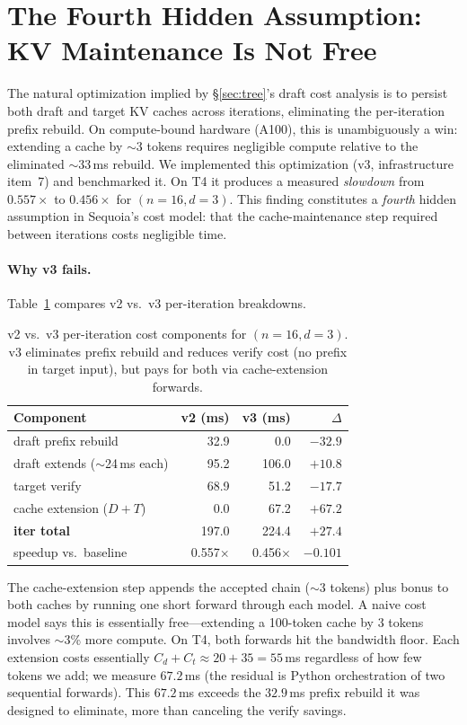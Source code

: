 \documentclass[letterpaper,twocolumn,10pt]{article}
\begin{document}
\section{The Fourth Hidden Assumption: KV Maintenance Is Not Free}
\label{sec:fourth}

The natural optimization implied by \S\ref{sec:tree}'s draft cost analysis is to persist both draft and target KV caches across iterations, eliminating the per-iteration prefix rebuild.
On compute-bound hardware (A100), this is unambiguously a win: extending a cache by $\sim$3 tokens requires negligible compute relative to the eliminated $\sim$33\,ms rebuild.
We implemented this optimization (v3, infrastructure item~7) and benchmarked it.
On T4 it produces a measured \emph{slowdown} from $0.557\times$ to $0.456\times$ for $(n{=}16, d{=}3)$.
This finding constitutes a \emph{fourth} hidden assumption in Sequoia's cost model: that the cache-maintenance step required between iterations costs negligible time.

\paragraph{Why v3 fails.}
Table~\ref{tab:v2v3} compares v2 vs.\ v3 per-iteration breakdowns.

\begin{table}[t]
\centering
\small
\caption{v2 vs.\ v3 per-iteration cost components for $(n{=}16, d{=}3)$. v3 eliminates prefix rebuild and reduces verify cost (no prefix in target input), but pays for both via cache-extension forwards.}
\label{tab:v2v3}
\smallskip
\begin{tabular}{@{}lrrr@{}}
\toprule
Component & v2 (ms) & v3 (ms) & $\Delta$ \\
\midrule
draft prefix rebuild & 32.9 & 0.0 & $-32.9$ \\
draft extends ($\sim$24\,ms each) & 95.2 & 106.0 & $+10.8$ \\
target verify          & 68.9 & 51.2 & $-17.7$ \\
cache extension ($D + T$)  & 0.0 & 67.2 & $+67.2$ \\
\midrule
\textbf{iter total}    & 197.0 & 224.4 & $+27.4$ \\
\midrule
speedup vs.\ baseline  & 0.557$\times$ & 0.456$\times$ & $-0.101$ \\
\bottomrule
\end{tabular}
\end{table}

The cache-extension step appends the accepted chain ($\sim$3 tokens) plus bonus to both caches by running one short forward through each model.
A naive cost model says this is essentially free---extending a 100-token cache by 3 tokens involves $\sim$3\% more compute.
On T4, both forwards hit the bandwidth floor.
Each extension costs essentially $C_d + C_t \approx 20 + 35 = 55$\,ms regardless of how few tokens we add; we measure $67.2$\,ms (the residual is Python orchestration of two sequential forwards).
This $67.2$\,ms exceeds the $32.9$\,ms prefix rebuild it was designed to eliminate, more than canceling the verify savings.
\end{document}
